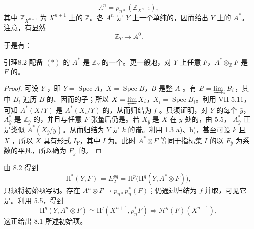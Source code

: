 \[A^n=p_{n*}(\mathbb Z_{X^{n+1}}),\]
其中 $\mathbb Z_{X^{n+1}}$ 为 $X^{n+1}$ 上的 $\mathbb Z$。各 $A^n$ 是 $Y$ 上一个单纯的，因而给出 $Y$ 上的 $A^*$。注意，有显然
\[\mathbb Z_Y\longrightarrow A^0.\tag{*}\]
于是有：
\begin{SGAresult}{引理}{8.2}
配备 $(*)$ 的 $A^*$ 是 $\mathbb Z_Y$ 的一个。更一般地，对 $Y$ 上任意 $F$，$A^*\otimes_{\mathbb Z}F$ 是 $F$ 的。
\end{SGAresult}
\begin{proof}
可设 $Y$ ，即 $Y=\operatorname{Spec}A$，$X=\operatorname{Spec}B$，$B$ 是整 $A$ 。有 $B=\varinjlim_iB_i$，其中 $B_i$ 遍历 $B$ 的、因而的子；所以 $X=\varprojlim X_i$，$X_i=\operatorname{Spec}B_i$。利用 VII 5.11，可知 $A^*(X/Y)$ 是 $A^*(X_i/Y)$ 的，从而归结为 $f$ 。只须证明，对 $Y$ 的每个 $\bar y$， $A^*_{\bar y}$ 是 $\mathbb Z_{\bar y}$ 的，并且与任意 $F$ 张量后仍是。若 $X_{\bar y}$ 是 $X$ 在 $\bar y$ 处的，由 5.5， $A^*_{\bar y}$ 正是类似 $A^*(X_{\bar y}/\bar y)$。从而归结为 $Y$ 是 $k$ 的谱。利用 1.3 a)、b)，甚至可设 $k$ 且 $X$ ，所以 $X$ 具有形式
$I_Y$，其中 $I$ 为。此时 $A^*\otimes F$ 等同于指标集 $I$ 的以 $F_{\bar y}$ 为系数的平凡，所以确为 $F_{\bar y}$ 的。
\end{proof}
由 8.2 得到
\[\mathrm H^*(Y,F)\Longleftarrow E_2^{pq}=\mathrm H^p\bigl(\mathrm H^q(Y,A^*\otimes F)\bigr),\]
只须将初始项写明。存在 $A^n\otimes F\to p_{n*}p_n^*(F)$；仍通过归结为 $f$ 并取，可见它是。利用 5.5，得到
\[\mathrm H^q(Y,A^n\otimes F)\simeq\mathrm H^q(X^{n+1},p_n^*F)\Longrightarrow\mathscr H^q(F)(X^{n+1}),\]
这正给出 8.1 所述初始项。
